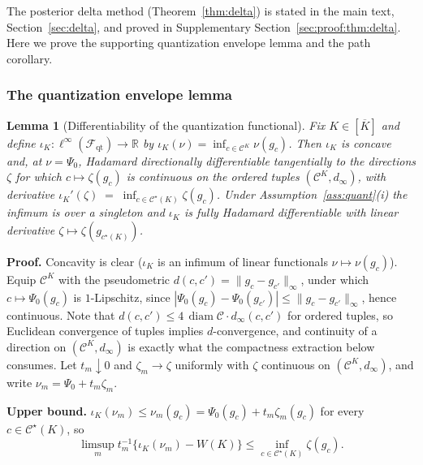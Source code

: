 \documentclass[11pt]{article}
\newtheorem{lemma}{Lemma}
\newcommand{\R}{\mathbb R}
\newcommand{\diam}{\operatorname{diam}}
\newcommand{\calC}{\mathcal C}
\newcommand{\calF}{\mathcal F}
\newcommand{\norm}[1]{\lVert #1\rVert}
\begin{document}
The posterior delta method (Theorem~\ref{thm:delta}) is stated in the main text, Section~\ref{sec:delta}, and proved in Supplementary Section~\ref{sec:proof:thm:delta}. Here we prove the supporting quantization envelope lemma and the path corollary.

\subsubsection{The quantization envelope lemma}

\begin{lemma}[Differentiability of the quantization functional]\label{lem:envelope}
Fix $K\in[\overline K]$ and define $\iota_K:\ell^\infty(\calF_{\mathrm{qt}})\to\R$ by $\iota_K(\nu)=\inf_{c\in\calC^K}\nu(g_c)$. Then $\iota_K$ is concave and, at $\nu=\Psi_0$, Hadamard directionally differentiable tangentially to the directions $\zeta$ for which $c\mapsto\zeta(g_c)$ is continuous on the ordered tuples $(\calC^K,d_\infty)$, with derivative $\iota_K'(\zeta)\;=\;\inf_{c\in\calC^\star(K)}\zeta(g_c)$.
Under Assumption~\ref{ass:quant}\textup{(i)} the infimum is over a singleton and $\iota_K$ is fully Hadamard differentiable with linear derivative $\zeta\mapsto\zeta(g_{c^\star(K)})$.
\end{lemma}

\textbf{Proof.} Concavity is clear ($\iota_K$ is an infimum of linear functionals $\nu\mapsto\nu(g_c)$). Equip $\calC^K$ with the pseudometric $d(c,c')=\norm{g_c-g_{c'}}_\infty$, under which $c\mapsto\Psi_0(g_c)$ is $1$-Lipschitz, since $|\Psi_0(g_c)-\Psi_0(g_{c'})|\le\norm{g_c-g_{c'}}_\infty$, hence continuous. Note that $d(c,c')\le4\,\diam\calC\cdot d_\infty(c,c')$ for ordered tuples, so Euclidean convergence of tuples implies $d$-convergence, and continuity of a direction on $(\calC^K,d_\infty)$ is exactly what the compactness extraction below consumes. Let $t_m\downarrow0$ and $\zeta_m\to\zeta$ uniformly with $\zeta$ continuous on $(\calC^K,d_\infty)$, and write $\nu_m=\Psi_0+t_m\zeta_m$.

\textbf{Upper bound.} $\iota_K(\nu_m)\le\nu_m(g_c)=\Psi_0(g_c)+t_m\zeta_m(g_c)$ for every $c\in\calC^\star(K)$, so
\begin{equation*}
\limsup_m t_m^{-1}\{\iota_K(\nu_m)-W(K)\}\le\inf_{c\in\calC^\star(K)}\zeta(g_c).
\end{equation*}
\end{document}
